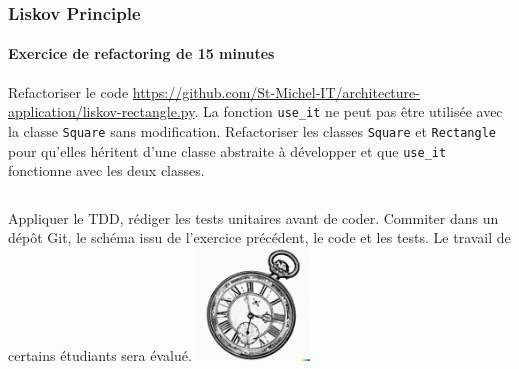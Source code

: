 \documentclass{beamer}
\begin{document}
    \begin{frame}
        \transdissolve
        \frametitle{Liskov Principle}
        \framesubtitle{Exercice \execcounterdispinc{} de refactoring de 15 minutes}
        Refactoriser le code \url{https://github.com/St-Michel-IT/architecture-application/liskov-rectangle.py}.
        La fonction \lstinline{use_it} ne peut pas être utilisée avec la classe \lstinline{Square} sans modification.
        Refactoriser les classes \lstinline{Square} et \lstinline{Rectangle} pour qu'elles héritent d'une classe abstraite à développer et que \lstinline{use_it} fonctionne avec les deux classes.
        \bigbreak
        \begin{columns}
            Appliquer le TDD, rédiger les tests unitaires avant de coder.
            \bigbreak
            Commiter dans un dépôt Git, le schéma issu de l'exercice précédent, le code et les tests.
            \bigbreak
            Le travail de certains étudiants sera évalué.
            \centering
            \includegraphics[width=3cm]{image/engraving-of-an-old-watch}
        \end{columns}
    \end{frame}
\end{document}
